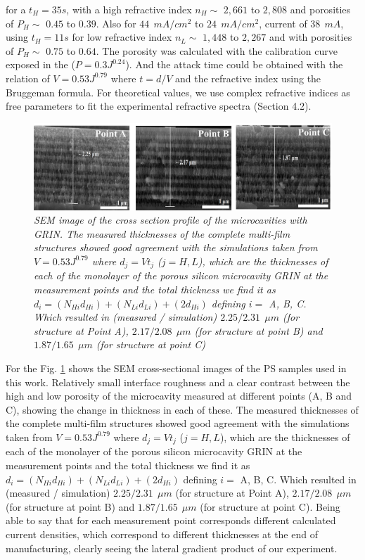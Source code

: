 \documentclass{article}
\begin{document}
for a $t_H=35 s $, with a high refractive index $n_H \sim$ $
2,661$ to $ 2,808$ and porosities of $P_H \sim$ $ 0.45 $ to $
0.39 $. Also for $ 44 \ \ mA /cm^2 $ to $ 24 \ \ mA / cm^2 $, current
of $ 38 \ \ mA $, using $t_H=11 s$  for low refractive index
$n_L\sim$ $ 1,448 $ to $ 2,267 $ and with porosities of
$P_H \sim$ $0.75 $ to $ 0.64 $. The porosity was calculated with
the calibration curve exposed in the ($ P = 0.3J^{0.24} $). And the
attack time could be obtained with the relation of $ V = 0.53J^{0.79}
$ where $ t = d / V $ and the refractive index using the Bruggeman
formula. For theoretical values, we use complex refractive indices as
free parameters to fit the experimental refractive spectra (Section
4.2).
 \begin{figure}
   \centering
   \includegraphics[scale=.5]{Images/MCGRINSEM}
   \caption{\emph{SEM image of the cross section profile of the
       microcavities with GRIN. The measured thicknesses of the
       complete multi-film structures showed good agreement with the
       simulations taken from $ V = 0.53J ^ {0.79} $ where $d_j=Vt_j$
       ($j=H,L$), which are the thicknesses of each of the monolayer
       of the porous silicon microcavity GRIN at the measurement
       points and the total thickness we find it as $d_i =
       (N_{Hi}d_{Hi})+(N_{Li}d_{Li}) + (2d_{Hi})$
       defining $ i = $ A, B, C. Which resulted in (measured /
       simulation) $ 2.25 / 2.31 \ \ \mu m $ (for structure at Point
       A), $ 2.17 / 2.08 \ \ \mu m $ (for structure at point B) and $
       1.87 / 1.65 \ \ \mu m $ (for structure at point C)}}
	\label{fig:MCGRIN4}
\end{figure}

For the Fig. \ref{fig:MCGRIN4} shows the SEM cross-sectional images of
the PS samples used in this work. Relatively small interface
roughness and a clear contrast between the high and low porosity of
the microcavity measured at different points (A, B and C), showing the
change in thickness in each of these. The measured thicknesses of the
complete multi-film structures showed good agreement with the
simulations taken from $ V = 0.53J^{0.79} $ where $d_j=Vt_j$
($j=H,L$), which are the thicknesses of each of the monolayer of the
porous silicon microcavity GRIN at the measurement points and the
total thickness we find it as $d_i =
(N_{Hi}d_{Hi})+(N_{Li}d_{Li}) + (2d_{Hi})$ defining $ i
= $ A, B, C. Which resulted in (measured / simulation) $ 2.25 / 2.31 \
\ \mu m $ (for structure at Point A), $ 2.17 / 2.08 \ \ \mu m $ (for
structure at point B) and $ 1.87 / 1.65 \ \ \mu m $ (for structure at
point C).
Being able to say that for each measurement point corresponds
different calculated current densities, which correspond to different
thicknesses at the end of manufacturing, clearly seeing the lateral
gradient product of our experiment.
\end{document}
